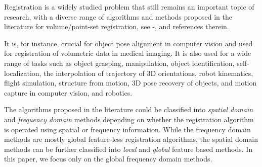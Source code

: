 \documentclass{UCF_ETD}
\begin{document}
Registration is a widely studied problem that still remains an important  topic of research, with a diverse range of algorithms and methods proposed in the literature for volume/point-set registration, see \cite{Gholipour2007}-\cite{Xiao2015}, and references therein.


It is, for instance, crucial for object pose alignment in computer vision and used for registration of volumetric data in medical imaging. It is also used for a wide range of tasks such as object grasping, manipulation, object identification, self-localization, the interpolation of trajectory of $3$D orientations, robot kinematics, flight simulation, structure from motion, $3$D pose recovery of objects, and motion capture in computer vision, and robotics.

The algorithms proposed in the literature could be classified into \emph{spatial domain}  and \emph{frequency domain} methods depending on whether the 
registration algorithm is operated using spatial or frequency information. While the frequency domain methods are mostly global feature-less registration algorithms, the spatial domain methods can be further classified into \emph{local} and \emph{global} feature based methods. In this paper, we focus only on the global frequency domain methods. 
\end{document}
